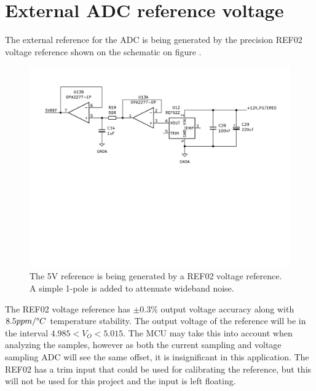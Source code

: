 \section{External ADC reference voltage} \label{subsec:5VREF}

The  external reference for the ADC is being generated by the precision REF02 voltage reference shown on the schematic on figure . 

\begin{figure}[H]
    \centering
    \includegraphics[clip, trim=0 300 0 0, width=1\textwidth]{Sections/7_SystemDesign/Figures/7_1_3_REF.pdf}
    \caption{The 5V reference is being generated by a REF02 voltage reference\cite{REF02}. A simple 1-pole is added to attenuate wideband noise.}
    \label{fig_7_1_3_REF}
\end{figure}

The REF02 voltage reference has $\pm 0.3\%$ output voltage accuracy along with $8.5 ppm / \degree C$ temperature stability. The output voltage of the reference will be in the interval $4.985 < V_O < 5.015$. The MCU may take this into account when analyzing the samples, however as both the current sampling and voltage sampling ADC will see the same offset, it is insignificant in this application. The REF02 has a trim input that could be used for calibrating the reference, but this will not be used for this project and the input is left floating.

